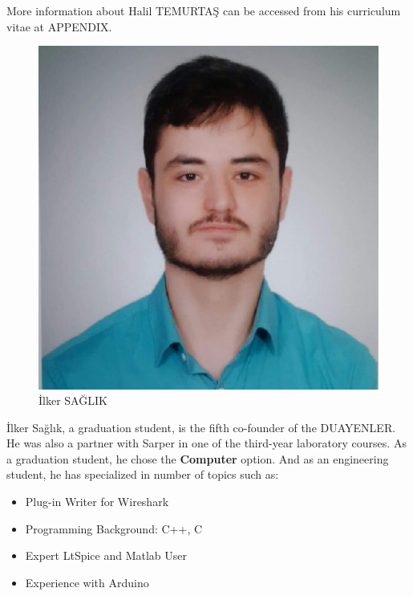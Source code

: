 \documentclass[a4paper,12pt]{article}
\begin{document}
More information about Halil TEMURTAŞ can be accessed from his curriculum vitae at APPENDIX.\\[0.4cm]


\begin{minipage}{0.38\textwidth}
\begin{flushleft}

\begin{figure}[H]
	\center
	\setlength{\unitlength}{\textwidth} 
	\includegraphics[width=0.7\unitlength]{images/ilker_foto}
	\caption{\label{fig:ilker_foto} \small İlker SAĞLIK }
\end{figure}


\end{flushleft}
\end{minipage}
\begin{minipage}{0.61\textwidth}
\begin{flushleft}

	İlker Sağlık, a graduation student, is the fifth co-founder of the DUAYENLER. He was also a partner with Sarper in one of the third-year laboratory courses. As a graduation student, he chose the \textbf{Computer} option. And as an engineering student, he has specialized in number of topics such as:
		
\begin{itemize}
	\item Plug-in Writer for Wireshark 
	\item Programming Background: C++, C 
	\item Expert LtSpice and Matlab User
	\item Experience with Arduino
\end{itemize}

\end{flushleft} 
\end{minipage}\\[0.4cm]
\end{document}

